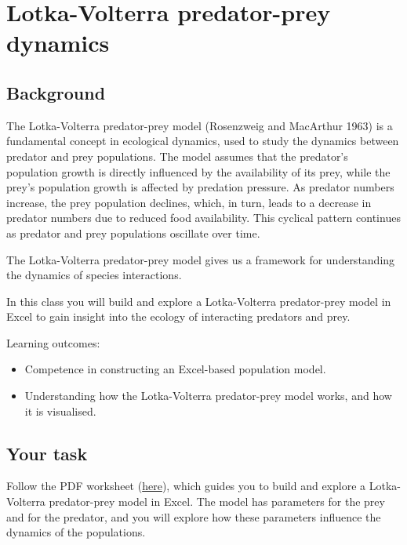 \documentclass[
  a4paper]{book}
\providecommand{\tightlist}{%
  \setlength{\itemsep}{0pt}\setlength{\parskip}{0pt}}
\begin{document}
\chapter{Lotka-Volterra predator-prey dynamics}\label{lotka-volterra-predator-prey-dynamics}

\section{Background}\label{background-15}

The Lotka-Volterra predator-prey model (Rosenzweig and MacArthur 1963) is a fundamental concept in ecological dynamics, used to study the dynamics between predator and prey populations. The model assumes that the predator's population growth is directly influenced by the availability of its prey, while the prey's population growth is affected by predation pressure. As predator numbers increase, the prey population declines, which, in turn, leads to a decrease in predator numbers due to reduced food availability. This cyclical pattern continues as predator and prey populations oscillate over time.

The Lotka-Volterra predator-prey model gives us a framework for understanding the dynamics of species interactions.

In this class you will build and explore a Lotka-Volterra predator-prey model in Excel to gain insight into the ecology of interacting predators and prey.

\begin{do-something}
Learning outcomes:

\begin{itemize}
\tightlist
\item
  Competence in constructing an Excel-based population model.
\item
  Understanding how the Lotka-Volterra predator-prey model works, and
  how it is visualised.
\end{itemize}
\end{do-something}

\section{Your task}\label{your-task-15}

Follow the PDF worksheet (\href{https://www.dropbox.com/s/bhwoe161wp9p6hp/10.\%20Predator-prey\%20dynamics.pdf?dl=1}{here}), which guides you to build and explore a Lotka-Volterra predator-prey model in Excel. The model has parameters for the prey and for the predator, and you will explore how these parameters influence the dynamics of the populations.
\end{document}
